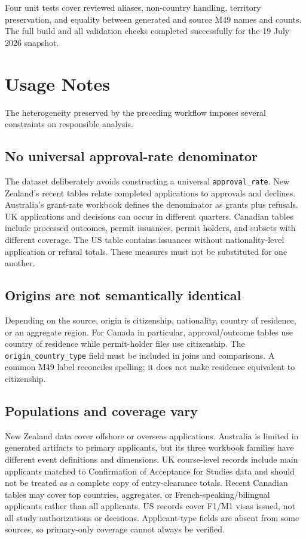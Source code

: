 \documentclass[runningheads]{llncs}
\begin{document}
Four unit tests cover reviewed aliases, non-country handling, territory preservation, and equality between generated and source M49 names and counts. The full build and all validation checks completed successfully for the 19 July 2026 snapshot.

\section{Usage Notes}

The heterogeneity preserved by the preceding workflow imposes several constraints on responsible analysis.

\subsection{No universal approval-rate denominator}

The dataset deliberately avoids constructing a universal \texttt{approval\_rate}. New Zealand's recent tables relate completed applications to approvals and declines. Australia's grant-rate workbook defines the denominator as grants plus refusals. UK applications and decisions can occur in different quarters. Canadian tables include processed outcomes, permit issuances, permit holders, and subsets with different coverage. The US table contains issuances without nationality-level application or refusal totals. These measures must not be substituted for one another.

\subsection{Origins are not semantically identical}

Depending on the source, origin is citizenship, nationality, country of residence, or an aggregate region. For Canada in particular, approval/outcome tables use country of residence while permit-holder files use citizenship. The \texttt{origin\_country\_type} field must be included in joins and comparisons. A common M49 label reconciles spelling; it does not make residence equivalent to citizenship.

\subsection{Populations and coverage vary}

New Zealand data cover offshore or overseas applications. Australia is limited in generated artifacts to primary applicants, but its three workbook families have different event definitions and dimensions. UK course-level records include main applicants matched to Confirmation of Acceptance for Studies data and should not be treated as a complete copy of entry-clearance totals. Recent Canadian tables may cover top countries, aggregates, or French-speaking/bilingual applicants rather than all applicants. US records cover F1/M1 visas issued, not all study authorizations or decisions. Applicant-type fields are absent from some sources, so primary-only coverage cannot always be verified.
\end{document}
